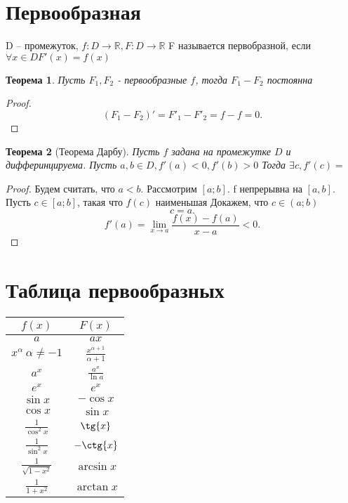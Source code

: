 \documentclass[a4paper]{scrartcl}
\newtheorem{theorem}{Теорема}
\begin{document}
\section{Первообразная}
D -- промежуток, $f : D \to \mathbb{R}, F: D \to \mathbb{R}$
F называется первобразной, если $\forall  x \in D F'(x) = f(x)$
\begin{theorem}
    Пусть  $F_1,F_2$ - первообразные $f$, тогда  $F_1 - F_2$ постоянна
\end{theorem}
\begin{proof}
    \[
        (F_1 - F_2)' = F'_1 - F'_2 = f - f = 0
    .\] 
\end{proof}
\begin{theorem}[Теорема Дарбу]
    Пусть $f$ задана на промежутке  $D$ и дифферинцируема. Пусть  $a,b \in D, f'(a) < 0 , f'(b) > 0$ Тогда  $\exists c, f'(c) = $
\end{theorem}
\begin{proof}
    Будем считать, что $a < b$. Рассмотрим  $[a;b]$. f непрерывна на  $[a,b]$. Пусть  $c \in [a;b]$, такая что  $f(c)$ наименьшая
    Докажем, что  $c \in (a;b)$
     \[
    c =  a
    .\] 
    \[
    f'(a) = \lim_{x \to a} \frac{f(x) - f(a)}{x - a} < 0
    .\] 
\end{proof}
\section{Таблица первообразных}
\begin{center}
    \begin{tabular}{|c|c|}
        \hline
        $f(x)$ &  $F(x)$\\
        \hline
        $a$ &  $ax$\\
        \hline
        $x^{\alpha} ~ \alpha \neq -1$ & $\frac{x^{\alpha + 1}}{\alpha + 1}$\\
        \hline
        $a^{x}$ &  $\frac{a^x}{\ln{a}}$ \\
        \hline
        $e^x$ &  $e^x$\\
        \hline
        $\sin{x}$ &  $-\cos{x}$\\
        \hline
        $\cos{x}$ &  $\sin{x}$\\
        \hline
        $\frac{1}{\cos^2{x}}$ & $\tg{x}$\\
        \hline
        $\frac{1}{\sin^2{x}}$ & $-\ctg{x}$\\
        \hline
        $\frac{1}{\sqrt{1 - x^2} }$ & $\arcsin{x}$\\
        \hline
        $\frac{1}{1 + x^2}$ & $\arctan{x}$\\
        \hline
    \end{tabular}
\end{center}
\end{document}
